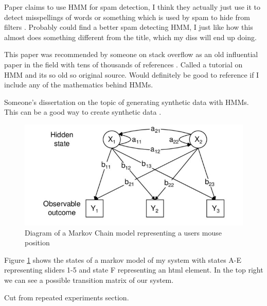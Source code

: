\documentclass{article}
\begin{document}
Paper claims to use HMM for spam detection, I think they actually just use it to detect misspellings of words or something which is used by spam to hide from filters \cite{gordillo2007hmm}.
Probably could find a better spam detecting HMM, I just like how this almost does something different from the title, which my diss will end up doing.

This paper was recommended by someone on stack overflow as an old influential paper in the field with tens of thousands of references \cite{rabiner1989tutorial}.
Called a tutorial on HMM and its so old so original source. 
Would definitely be good to reference if I include any of the mathematics behind HMMs. 

Someone's dissertation on the topic of generating synthetic data with HMMs.
This can be a good way to create synthetic data \cite{ferrando2018generating}.


\begin{figure}[ht]
    \centering
    \includegraphics[scale=1.5]{Images/HMM-Paper-Diagram.png}
    \caption{Diagram of a Markov Chain model representing a users mouse position}
    \label{fig:Markov}
\end{figure}

Figure \ref{fig:Markov} shows the states of a markov model of my system with states A-E representing sliders 1-5 and state F representing an html element.
In the top right we can see a possible transition matrix of our system.



Cut from repeated experiments section.
\end{document}
